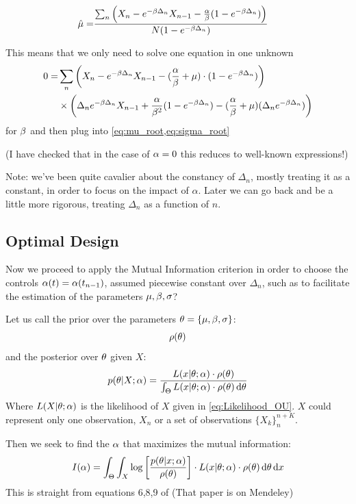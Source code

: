 \documentclass{article}
\begin{document}
\begin{align}
\hat{{\mu }} =&  \frac{ \sum_n \left( X_n - e^{-{\beta} \Delta_n} X_{n-1} -
	\frac{{\alpha}}{{\beta}} ( 1-e^{-{\beta} \Delta_n}) \right)}
	{N ( 1-e^{-{\beta} \Delta_n})}
	\label{eq:mu_root}
\end{align}

This means that we only need to solve one equation in one unknown
\begin{align}
\label{eq:beta_root}
0=& \sum_n \left( X_n - e^{-{\beta} \Delta_n} X_{n-1} -
  (\frac {{{\alpha}}}{{{\beta}}} + {\mu }) \cdot ( 1-e^{-{\beta} \Delta_n})  \right) 
  \\ \notag 
  & \times \left( \Delta_n e^{- {\beta} \Delta_n}X_{n-1} 
  							  + \frac{ {\alpha} } {{\beta}^2} (1-e^{-{\beta} \Delta_n}) 
  					 		  - (\frac {{{\alpha}}}{{{\beta}}} + {\mu }) ( \Delta_n e^{- {\beta} \Delta_n})          
  					 		  \right)
\end{align}
for ${\beta}$ and then plug into \cref{eq:mu_root,eq:sigma_root}

(I have checked that in the case of ${\alpha}=0$ this reduces to well-known
expressions!)

Note: we've been quite cavalier about the constancy of $\Delta_n$, mostly
treating it as a constant, in order to focus on the impact of $\alpha$. Later we
can go back and be a little more rigorous, treating $\Delta_n$ as a function of
$n$.
%  

\subsection{Optimal Design}
Now we proceed to apply the Mutual Information criterion in order to choose the
controls ${\alpha}(t) = {\alpha}(t_{n-1})$, assumed piecewise constant over $\Delta_n$, such
as to facilitate the estimation of the parameters ${\mu },{\beta},{\sigma }$?
   
Let us call the prior over the parameters ${\theta} = \{{\mu }, {\beta}, {\sigma }\}$:
$$\rho({\theta})$$
and the posterior over ${\theta}$ given $X$:
\begin{equation}
p({\theta}| X; {\alpha}) =
\frac{L(x|{\theta}; {\alpha})\cdot \rho({\theta})}{\int_\Theta L(x|{\theta}; {\alpha})\cdot \rho({\theta})
\, \mathrm{d} {\theta}}
\label{eq:parameter_posterior_defn}
\end{equation} 
Where $ L(X|{\theta}; {\alpha})$ is the likelihood of $X$ given in
\cref{eq:Likelihood_OU}. $X$ could represent only one observation, $X_n$ or a
set of observations $\{X_k\}_n^{n+K}$.

Then we seek to find the ${\alpha}$ that maximizes the
mutual information:
\begin{equation}
I({\alpha}) = \int_\Theta \int_X  \log\left[\frac{p({\theta}| x; {\alpha})}{\rho({\theta})}\right]
\cdot L(x| {\theta};{\alpha}) \cdot \rho({\theta}) \, \mathrm{d} {\theta} \, \mathrm{d} x
\label{eq:mutual_info_objective}
\end{equation}
This is straight from equations 6,8,9 of \cite{Myung2013} (That paper is on
Mendeley)
 
\end{document}
